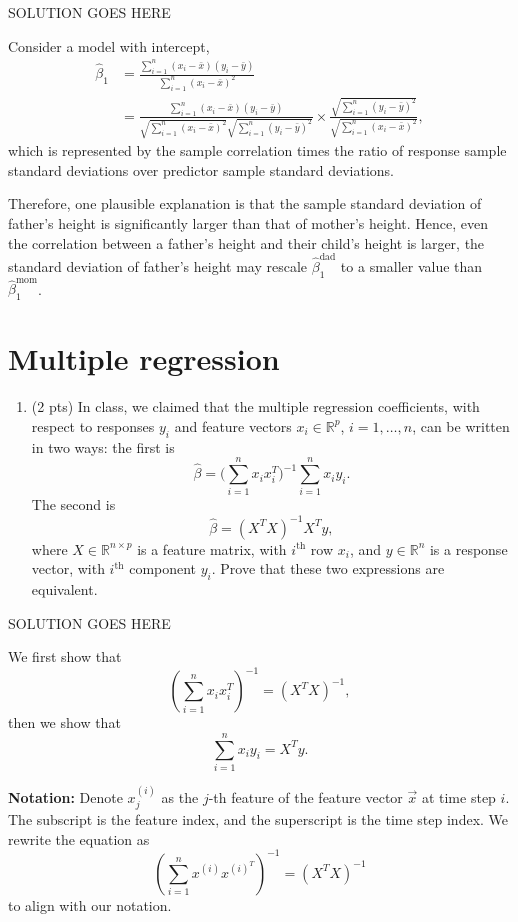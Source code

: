 \documentclass[
]{article}
\providecommand{\tightlist}{%
  \setlength{\itemsep}{0pt}\setlength{\parskip}{0pt}}
\begin{document}
SOLUTION GOES HERE

Consider a model with intercept, \begin{align*}
    \hat{\beta}_1 & = \frac{\sum_{i=1}^n(x_i-\bar{x})(y_i-\bar{y})}{\sum_{i=1}^n(x_i-\bar{x})^2} \\
    & = \frac{\sum_{i=1}^n(x_i-\bar{x})(y_i-\bar{y})}{\sqrt{\sum_{i=1}^n(x_i-\bar{x})^2}\sqrt{\sum_{i=1}^{n}(y_i-\bar{y})^2}}\times 
    \frac{\sqrt{\sum_{i=1}^{n}(y_i-\bar{y})^2}}{\sqrt{\sum_{i=1}^{n}(x_i-\bar{x})^2}},
\end{align*} which is represented by the sample correlation times the
ratio of response sample standard deviations over predictor sample
standard deviations.

Therefore, one plausible explanation is that the sample standard
deviation of father's height is significantly larger than that of
mother's height. Hence, even the correlation between a father's height
and their child's height is larger, the standard deviation of father's
height may rescale \(\hat{\beta}_1^{\text{dad}}\) to a smaller value
than \(\hat{\beta}_1^{\text{mom}}\).

\hypertarget{multiple-regression}{%
\section{Multiple regression}\label{multiple-regression}}

\begin{enumerate}
\def\labelenumi{\arabic{enumi}.}
\setcounter{enumi}{4}
\tightlist
\item
  (2 pts) In class, we claimed that the multiple regression
  coefficients, with respect to responses \(y_i\) and feature vectors
  \(x_i \in \mathbb{R}^p\), \(i = 1,\dots,n\), can be written in two
  ways: the first is \[
  \hat\beta = \bigg( \sum_{i=1}^n x_i x_i^T \bigg)^{-1} \sum_{i=1}^n x_i y_i.
  \] The second is \[
  \hat\beta = (X^T X)^{-1} X^T y,
  \] where \(X \in \mathbb{R}^{n \times p}\) is a feature matrix, with
  \(i^{\text{th}}\) row \(x_i\), and \(y \in \mathbb{R}^n\) is a
  response vector, with \(i^{\text{th}}\) component \(y_i\). Prove that
  these two expressions are equivalent.
\end{enumerate}

SOLUTION GOES HERE

We first show that
\[\left(\sum_{i=1}^{n}x_ix_i^T\right)^{-1} = \left(X^TX\right)^{-1},\]
then we show that \[\sum_{i=1}^{n}x_iy_i = X^Ty.\]

\textbf{Notation:} Denote \(x_j^{(i)}\) as the \(j\)-th feature of the
feature vector \(\vec{x}\) at time step \(i\). The subscript is the
feature index, and the superscript is the time step index. We rewrite
the equation as
\[\left(\sum_{i=1}^{n}x^{(i)}x^{(i)^T}\right)^{-1} = \left(X^TX\right)^{-1}\]
to align with our notation.
\end{document}
